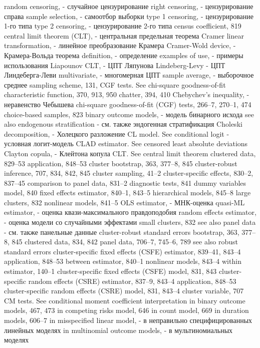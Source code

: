 random censoring, - случайное цензурирование 
right censoring, - цензурирование справа
sample selection, - самоотбор выборки
type 1 censoring, - цензурирование 1-го типа
type 2 censoring, - цензурирование 2-го типа 
census coefficient, 819
central limit theorem (CLT), - центральная предельная теорема
Cramer linear transformation, - линейное преобразование Крамера
Cramer-Wold device, - Крамера-Вольда теорема
definition, - определение
examples of use, - примеры использования 
Liapounov CLT, - ЦПТ Ляпунова 
Lindeberg-Levy - ЦПТ Линдеберга-Леви 
multivariate, - многомерная ЦПТ
sample average, - выборочное среднее
sampling scheme, 131,
CGF tests. See chi-square goodness-of-fit characteristic function, 370, 913, 950
chatter, 394, 410
Chebychev’s inequality, - неравенство Чебышева
chi-square goodness-of-fit (CGF) tests, 266–7, 270–1,
474
choice-based samples, 823
binary outcome models, - модель бинарного исхода
see also endogenous stratification - см. также эндогенная стратификация
Choleski decomposition, - Холецкого разложение
CL model. See conditional logit - условная логит-модель
CLAD estimator. See censored least absolute
deviations
Clayton copula, - Клейтона копула
CLT. See central limit theorem clustered data, 829–53
application, 848–53
cluster bootstrap, 363, 377–8, 845 cluster-robust inference, 707, 834, 842,
845
cluster sampling, 41–2
cluster-specific effects, 830–2, 837–45 comparison to panel data, 831–2 diagnostic tests, 841
dummy variables model, 840
fixed effects estimator, 840–1, 843–5 hierarchical models, 845–8
large clusters, 832
nonlinear models, 841–5
OLS estimator, - МНК-оценка
quasi-ML estimator, - оценка квази-максимального правдоподобия
random effects estimator, - оценка модели со случайными эффектами
small clusters, 832
see also panel data - см. также панельные данные
cluster-robust standard errors bootstrap, 363, 377–8, 845 clustered data, 834, 842
panel data, 706–7, 745–6, 789 see also robust standard errors
cluster-specific fixed effects (CSFE) estimator, 839–41, 843–4
application, 848–53 between estimator, 840–1 nonlinear models, 843–4 within estimator, 140–1
cluster-specific fixed effects (CSFE) model, 831, 843 cluster-specific random effects (CSRE) estimator,
837–9, 843–4 application, 848–53
cluster-specific random effects (CSRE) model, 831, 843–4
cluster variable, 707
CM tests. See conditional moment coefficient interpretation
in binary outcome models, 467, 473 
in competing risks model, 646
in count model, 669
in duration models, 606–7
in misspecified linear model, - в неправильно специфицированных линейных моделях
in multinomial outcome models, - в мультиномиальных моделях
